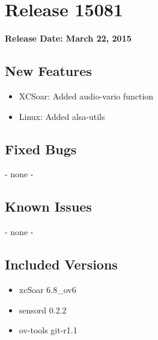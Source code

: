 \chapter*{Release 15081}

\begin{flushleft}
	\textbf{Release Date: March 22, 2015}
\end{flushleft}

\section*{New Features}

\begin{itemize}
	\item XCSoar: Added audio-vario function
	\item Linux: Added alsa-utils
\end{itemize}

\section*{Fixed Bugs}
	- none -

\section*{Known Issues}
	- none -

\section*{Included Versions}

\begin{itemize}
	\item xcSoar 6.8\_ov6
	\item sensord 0.2.2
	\item ov-tools git-r1.1
\end{itemize}